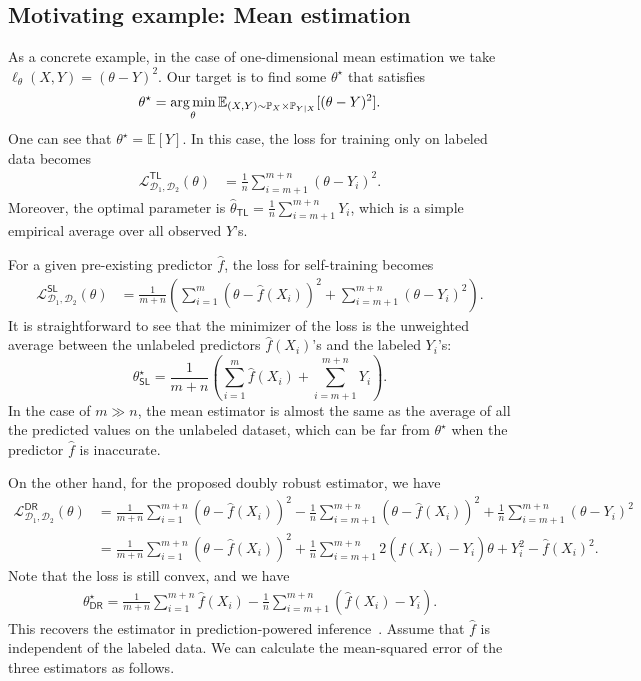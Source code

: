 \subsection{Motivating example: Mean estimation}\label{sec:mean}
 As a concrete example, in the case of one-dimensional mean estimation  we take $\ell_\theta(X, Y) = (\theta-Y)^2$. Our target is to find some $\theta^\star$ that satisfies
\begin{align*}
    \theta^\star = \operatorname*{arg\,min}_{\theta} \mathbb{E}_{(X, Y)\sim \mathbb{P}_{X}\times \mathbb{P}_{Y|X}}[(\theta-Y)^2].
\end{align*}
One can   see that $\theta^\star = \mathbb{E}[Y]$. In this case, the loss for training only on labeled data  becomes
\begin{align*}
\mathcal{L}^{\mathsf{TL}}_{\mathcal{D}_1,\mathcal{D}_2}(\theta) & =   \frac{1}{n}    \sum_{i=m+1}^{m+n} (\theta- Y_i)^2.
\end{align*}
Moreover, the optimal parameter is $\hat \theta_{\mathsf{TL}} =  \frac{1}{n}\sum_{i=m+1}^{m+n} Y_i$, which is a simple empirical average over all observed $Y$'s.

For a given pre-existing predictor $\hat f$, the loss for  self-training  becomes
\begin{align*}
\mathcal{L}^{\mathsf{SL}}_{\mathcal{D}_1,\mathcal{D}_2}(\theta) & =   \frac{1}{m+n}  \left(\sum_{i=1}^m (\theta-\hat f(X_i))^2 + \sum_{i=m+1}^{m+n} (\theta- Y_i)^2\right).
\end{align*}
It is straightforward to see that the minimizer of the loss is the unweighted average between the unlabeled predictors $\hat f(X_i)$'s and the labeled $Y_i$'s:  $$\theta^\star_{\mathsf{SL}} = \frac{1}{m+n}\left(  \sum_{i=1}^m \hat f(X_i)+ \sum_{i=m+1}^{m+n} Y_i\right). $$
In the case of $m\gg n$, the mean estimator is almost the same as the average of all the predicted values on the unlabeled dataset, which can be far from $\theta^\star$ when the predictor $\hat f$ is inaccurate.


On the other hand, for the proposed doubly robust estimator, we have
\begin{align*}
\mathcal{L}^{\mathsf{DR}}_{\mathcal{D}_1,\mathcal{D}_2}(\theta) 
& = \frac{1}{m+n}  \sum_{i=1}^{m+n} (\theta- \hat f(X_i))^2 -  \frac{1}{n} \sum_{i=m+1}^{m+n} (\theta- \hat f(X_i))^2  + \frac{1}{n} \sum_{i=m+1}^{m+n} (\theta-  Y_i)^2  \\
& = \frac{1}{m+n}  \sum_{i=1}^{m+n} (\theta- \hat f(X_i))^2 + \frac{1}{n} \sum_{i=m+1}^{m+n} 2 (\hat f(X_i)-Y_i)\theta + Y_i^2 - \hat f(X_i)^2.
\end{align*}
Note that the loss is still convex, and we have
\begin{align*}  
\theta^\star_{\mathsf{DR}}= \frac{1}{m+n}  \sum_{i=1}^{m+n} \hat f(X_i) - \frac{1}{n}  \sum_{i=m+1}^{m+n} ( \hat f(X_i)-Y_i).
\end{align*}
This recovers the estimator in  prediction-powered inference~\citep{angelopoulos2023prediction}. Assume that $\hat f$ is independent of the labeled data. We can calculate the mean-squared error of the three estimators as follows.


